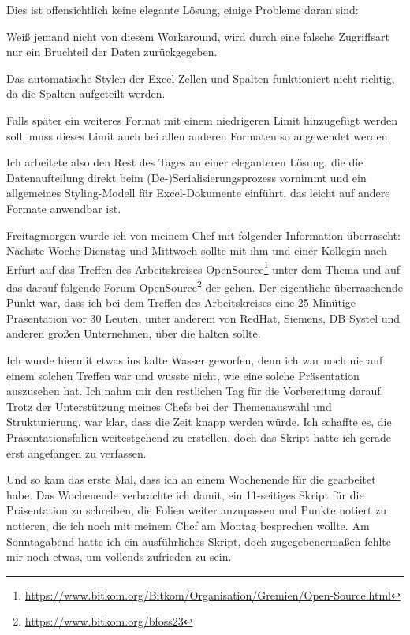 Dies ist offensichtlich keine elegante Lösung, einige Probleme daran sind:

\begin{smitemize}
    \item Weiß jemand nicht von diesem Workaround, wird durch eine falsche Zugriffsart nur ein Bruchteil der Daten zurückgegeben.
    \item Das automatische Stylen der Excel-Zellen und Spalten funktioniert nicht richtig, da die Spalten aufgeteilt werden.
    \item Falls später ein weiteres Format mit einem niedrigeren Limit hinzugefügt werden soll, muss dieses Limit auch bei allen anderen Formaten so angewendet werden.
\end{smitemize}

Ich arbeitete also den Rest des Tages an einer eleganteren Lösung, die die Datenaufteilung direkt beim (De-)Serialisierungsprozess vornimmt und ein allgemeines Styling-Modell für Excel-Dokumente einführt, das leicht auf andere Formate anwendbar ist.

\sweekdaymarginpar{\weekdayFridayLong}

Freitagmorgen wurde ich von meinem Chef mit folgender Information überrascht:
Nächste Woche Dienstag und Mittwoch sollte mit ihm und einer Kollegin nach Erfurt auf das Treffen des Arbeitskreises OpenSource\footnote{\url{https://www.bitkom.org/Bitkom/Organisation/Gremien/Open-Source.html}} unter dem Thema  und auf das darauf folgende Forum OpenSource\footnote{\url{https://www.bitkom.org/bfoss23}} der {\bitkom} gehen.
Der eigentliche überraschende Punkt war, dass ich bei dem Treffen des Arbeitskreises eine 25-Minütige Präsentation vor 30 Leuten, unter anderem von RedHat, Siemens, DB Systel und anderen großen Unternehmen, über die  halten sollte.

Ich wurde hiermit etwas ins kalte Wasser geworfen, denn ich war noch nie auf einem solchen Treffen war und wusste nicht, wie eine solche Präsentation auszusehen hat.
Ich nahm mir den restlichen Tag für die Vorbereitung darauf.
Trotz der Unterstützung meines Chefs bei der Themenauswahl und Strukturierung, war klar, dass die Zeit knapp werden würde.
Ich schaffte es, die Präsentationsfolien weitestgehend zu erstellen, doch das Skript hatte ich gerade erst angefangen zu verfassen.

\sweekdaymarginpar{\weekdaySaturdayShort, \weekdaySundayShort}

Und so kam das erste Mal, dass ich an einem Wochenende für die {\metaeffekt} gearbeitet habe.
Das Wochenende verbrachte ich damit, ein 11-seitiges Skript für die Präsentation zu schreiben, die Folien weiter anzupassen und Punkte notiert zu notieren, die ich noch mit meinem Chef am Montag besprechen wollte.
Am Sonntagabend hatte ich ein ausführliches Skript, doch zugegebenermaßen fehlte mir noch etwas, um vollends zufrieden zu sein.
